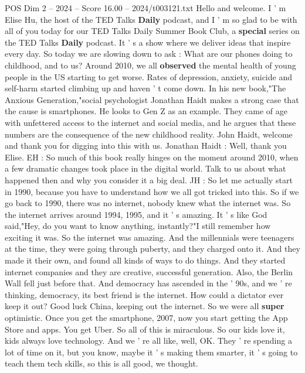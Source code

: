 \begin{textsample}{POS Dim 2 – 2024 – Score 16.00 – 2024/t003121.txt}  \label{ex:f2_pos_035}
Hello and welcome.
I ' m Elise Hu, the host of the TED Talks \textbf{Daily} podcast, and I ' m so glad to be with all of you today for our TED Talks Daily Summer Book Club, a \textbf{special} series on the TED Talks \textbf{Daily} podcast.
It ' s a show where we deliver ideas that inspire every day.
So today we are slowing down to ask : What are our phones doing to childhood, and to us?
Around 2010, we all \textbf{observed} the mental health of young people in the US starting to get worse.
Rates of depression, anxiety, suicide and self-harm started climbing up and haven ' t come down.
In his new book,"The Anxious Generation,"social psychologist Jonathan Haidt makes a strong case that the cause is smartphones.
He looks to Gen Z as an example.
They came of age with unfettered access to the internet and social media, and he argues that these numbers are the consequence of the new childhood reality.
John Haidt, welcome and thank you for digging into this with us.
Jonathan Haidt : Well, thank you Elise.
EH : So much of this book really hinges on the moment around 2010, when a few dramatic changes took place in the digital world.
Talk to us about what happened then and why you consider it a big deal.
JH : So let me actually start in 1990, because you have to understand how we all got tricked into this.
So if we go back to 1990, there was no internet, nobody knew what the internet was.
So the internet arrives around 1994, 1995, and it ' s amazing.
It ' s like God said,"Hey, do you want to know anything, instantly?"I still remember how exciting it was.
So the internet was amazing.
And the millennials were teenagers at the time, they were going through puberty, and they charged onto it.
And they made it their own, and found all kinds of ways to do things.
And they started internet companies and they are creative, successful generation.
Also, the Berlin Wall fell just before that.
And democracy has ascended in the ' 90s, and we ' re thinking, democracy, its best friend is the internet.
How could a dictator ever keep it out?
Good luck China, keeping out the internet.
So we were all \textbf{super} optimistic.
Once you get the smartphone, 2007, now you start getting the App Store and apps.
You get Uber.
So all of this is miraculous.
So our kids love it, kids always love technology.
And we ' re all like, well, OK.
They ' re spending a lot of time on it, but you know, maybe it ' s making them smarter, it ' s going to teach them tech skills, so this is all good, we thought.

\end{textsample}
